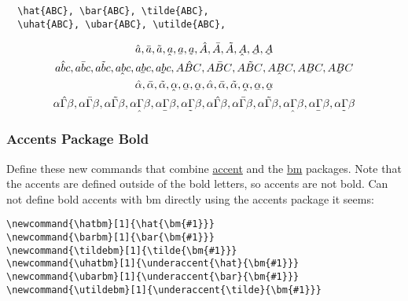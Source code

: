 \documentclass[12pt,english]{article}
\begin{document}
\begin{verbatim}
  \hat{ABC}, \bar{ABC}, \tilde{ABC},
  \uhat{ABC}, \ubar{ABC}, \utilde{ABC},
\end{verbatim}
\begin{align}
    \begin{gathered}
      \hat{a}, \bar{a}, \tilde{a}, \uhat{a}, \ubar{a}, \utilde{a},
      \hat{A}, \bar{A}, \tilde{A}, \uhat{A}, \ubar{A}, \utilde{A}
      \\
      \hat{abc}, \bar{abc}, \tilde{abc}, \uhat{abc}, \ubar{abc}, \utilde{abc},
      \hat{ABC}, \bar{ABC}, \tilde{ABC}, \uhat{ABC}, \ubar{ABC}, \utilde{ABC}
      \\
      \hat{\alpha}, \bar{\alpha}, \tilde{\alpha}, \uhat{\alpha}, \ubar{\alpha}, \utilde{\alpha},
      \hat{\alpha}, \bar{\alpha}, \tilde{\alpha}, \uhat{\alpha}, \ubar{\alpha}, \utilde{\alpha}
      \\
      \hat{\alpha\Gamma\beta}, \bar{\alpha\Gamma\beta}, \tilde{\alpha\Gamma\beta}, \uhat{\alpha\Gamma\beta}, \ubar{\alpha\Gamma\beta}, \utilde{\alpha\Gamma\beta},
      \hat{\alpha\Gamma\beta}, \bar{\alpha\Gamma\beta}, \tilde{\alpha\Gamma\beta}, \uhat{\alpha\Gamma\beta}, \ubar{\alpha\Gamma\beta}, \utilde{\alpha\Gamma\beta}
      \\
    \end{gathered}
\end{align}

\subsubsection{Accents Package Bold}

Define these new commands that combine \href{https://ctan.org/pkg/accents?lang=en}{accent} and the \href{https://ctan.org/pkg/bm?lang=en}{bm} packages. Note that the accents are defined outside of the bold letters, so accents are not bold. Can not define bold accents with bm directly using the accents package it seems:

\newcommand{\hatbm}[1]{\hat{\bm{#1}}}
\newcommand{\barbm}[1]{\bar{\bm{#1}}}
\newcommand{\tildebm}[1]{\tilde{\bm{#1}}}
\newcommand{\uhatbm}[1]{\underaccent{\hat}{\bm{#1}}}
\newcommand{\ubarbm}[1]{\underaccent{\bar}{\bm{#1}}}
\newcommand{\utildebm}[1]{\underaccent{\tilde}{\bm{#1}}}
\begin{verbatim}
\newcommand{\hatbm}[1]{\hat{\bm{#1}}}
\newcommand{\barbm}[1]{\bar{\bm{#1}}}
\newcommand{\tildebm}[1]{\tilde{\bm{#1}}}
\newcommand{\uhatbm}[1]{\underaccent{\hat}{\bm{#1}}}
\newcommand{\ubarbm}[1]{\underaccent{\bar}{\bm{#1}}}
\newcommand{\utildebm}[1]{\underaccent{\tilde}{\bm{#1}}}
\end{verbatim}
\end{document}
